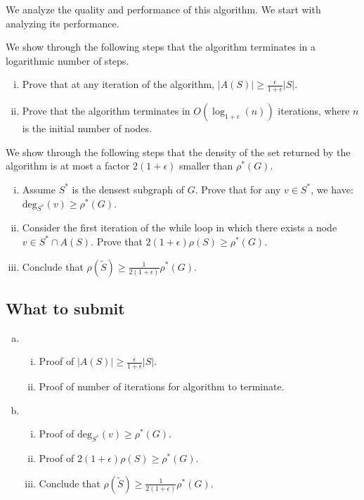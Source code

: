 We analyze the quality and performance of this algorithm. We start with analyzing its performance.

 We show through the following steps that the algorithm terminates in a logarithmic number of steps.
\begin{enumerate}[i.]
  \item Prove that at any iteration of the algorithm, $|A(S)|\geq \frac{\epsilon}{1+\epsilon} |S|$.
  \item Prove that the algorithm terminates in $O(\log_{1+\epsilon}{(n)})$ iterations, where $n$ is the initial number of nodes.
\end{enumerate}



 We show through the following steps that the density of the set returned by the algorithm is at most a factor $2(1+\epsilon)$ smaller than $\rho^{*}(G)$.
\begin{enumerate}[i.]
  \item Assume $S^{*}$ is the densest subgraph of $G$. Prove that for any $v\in S^{*}$, we have: $\mbox{deg}_{S^{*}}(v) \geq \rho^{*}(G)$.
  \item Consider the first iteration of the while loop in which there exists a node $v\in S^{*}\cap A(S)$. Prove that $2(1+\epsilon)\rho(S)\geq \rho^{*}(G)$.
  \item Conclude that $\rho(\tilde{S}) \geq \frac{1}{2(1+\epsilon)}\rho^{*}(G)$.
\end{enumerate}



\subsection*{What to submit}
\begin{enumerate}[(a)]
    \item
        \begin{enumerate}[i.]
            \item Proof of  $|A(S)|\geq \frac{\epsilon}{1+\epsilon} |S|$.
            \item Proof of  number of iterations for algorithm to terminate.
        \end{enumerate}
    \item
        \begin{enumerate}[i.]
            \item Proof of  $\mbox{deg}_{S^{*}}(v) \geq \rho^{*}(G)$.
            \item Proof of $2(1+\epsilon)\rho(S)\geq \rho^{*}(G)$.
            \item Conclude that $\rho(\tilde{S}) \geq \frac{1}{2(1+\epsilon)}\rho^{*}(G)$.
        \end{enumerate} 
\end{enumerate}


